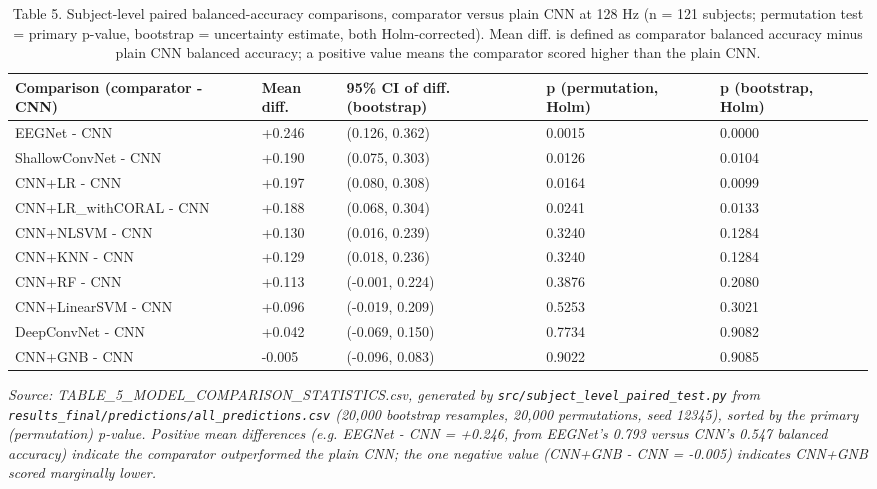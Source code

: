 \documentclass[a4paper,fleqn]{cas-sc}
\begin{document}
\begin{table}[htbp]
\centering
\small
\caption{Table 5. Subject-level paired balanced-accuracy comparisons, comparator versus plain CNN at 128 Hz (n = 121 subjects; permutation test = primary p-value, bootstrap = uncertainty estimate, both Holm-corrected). Mean diff. is defined as comparator balanced accuracy minus plain CNN balanced accuracy; a positive value means the comparator scored higher than the plain CNN.}
\begin{tabular}{lllll}
\toprule
Comparison (comparator - CNN) & Mean diff. & 95\% CI of diff. (bootstrap) & p (permutation, Holm) & p (bootstrap, Holm) \\
\midrule
EEGNet - CNN & +0.246 & (0.126, 0.362) & 0.0015 & 0.0000 \\
ShallowConvNet - CNN & +0.190 & (0.075, 0.303) & 0.0126 & 0.0104 \\
CNN+LR - CNN & +0.197 & (0.080, 0.308) & 0.0164 & 0.0099 \\
CNN+LR\_withCORAL - CNN & +0.188 & (0.068, 0.304) & 0.0241 & 0.0133 \\
CNN+NLSVM - CNN & +0.130 & (0.016, 0.239) & 0.3240 & 0.1284 \\
CNN+KNN - CNN & +0.129 & (0.018, 0.236) & 0.3240 & 0.1284 \\
CNN+RF - CNN & +0.113 & (-0.001, 0.224) & 0.3876 & 0.2080 \\
CNN+LinearSVM - CNN & +0.096 & (-0.019, 0.209) & 0.5253 & 0.3021 \\
DeepConvNet - CNN & +0.042 & (-0.069, 0.150) & 0.7734 & 0.9082 \\
CNN+GNB - CNN & -0.005 & (-0.096, 0.083) & 0.9022 & 0.9085 \\
\bottomrule
\end{tabular}
\end{table}

\textit{Source: TABLE\_5\_MODEL\_COMPARISON\_STATISTICS.csv, generated by \texttt{src/subject\_level\_paired\_test.py} from \texttt{results\_final/predictions/all\_predictions.csv} (20,000 bootstrap resamples, 20,000 permutations, seed 12345), sorted by the primary (permutation) p-value. Positive mean differences (e.g. EEGNet - CNN = +0.246, from EEGNet's 0.793 versus CNN's 0.547 balanced accuracy) indicate the comparator outperformed the plain CNN; the one negative value (CNN+GNB - CNN = -0.005) indicates CNN+GNB scored marginally lower.}
\end{document}

